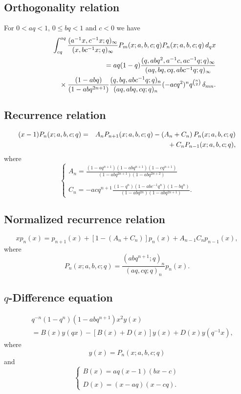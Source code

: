 \documentclass[envcountchap,graybox]{svmono}
\newcommand{\mathindent}{\hspace{7.5mm}}
\begin{document}
\subsection*{Orthogonality relation}
For $0<aq<1$, $0\leq bq<1$ and $c<0$ we have
\begin{eqnarray}
\label{OrtBigqJacobi}
& &\int_{cq}^{aq}\frac{(a^{-1}x,c^{-1}x;q)_{\infty}}{(x,bc^{-1}x;q)_{\infty}}
P_m(x;a,b,c;q)P_n(x;a,b,c;q)\,d_qx\nonumber\\
& &{}=aq(1-q)\frac{(q,abq^2,a^{-1}c,ac^{-1}q;q)_{\infty}}{(aq,bq,cq,abc^{-1}q;q)_{\infty}}\nonumber\\
& &{}\mathindent{}\times\frac{(1-abq)}{(1-abq^{2n+1})}
\frac{(q,bq,abc^{-1}q;q)_n}{(aq,abq,cq;q)_n}(-acq^2)^nq^{\binom{n}{2}}\,\delta_{mn}.
\end{eqnarray}

\subsection*{Recurrence relation}
\begin{eqnarray}
\label{RecBigqJacobi}
(x-1)P_n(x;a,b,c;q)&=&A_nP_{n+1}(x;a,b,c;q)-\left(A_n+C_n\right)P_n(x;a,b,c;q)\nonumber\\
& &{}\mathindent{}+C_nP_{n-1}(x;a,b,c;q),
\end{eqnarray}
where
$$\left\{\begin{array}{l}
\displaystyle A_n=\frac{(1-aq^{n+1})(1-abq^{n+1})(1-cq^{n+1})}{(1-abq^{2n+1})(1-abq^{2n+2})}\\
\\
\displaystyle C_n=-acq^{n+1}\frac{(1-q^n)(1-abc^{-1}q^n)(1-bq^n)}{(1-abq^{2n})(1-abq^{2n+1})}.
\end{array}\right.$$

\subsection*{Normalized recurrence relation}
\begin{equation}
\label{NormRecBigqJacobi}
xp_n(x)=p_{n+1}(x)+\left[1-(A_n+C_n)\right]p_n(x)+A_{n-1}C_np_{n-1}(x),
\end{equation}
where
$$P_n(x;a,b,c;q)=\frac{(abq^{n+1};q)_n}{(aq,cq;q)_n}p_n(x).$$

\subsection*{$q$-Difference equation}
\begin{eqnarray}
\label{dvBigqJacobi}
& &q^{-n}(1-q^n)(1-abq^{n+1})x^2y(x)\nonumber\\
& &{}=B(x)y(qx)-\left[B(x)+D(x)\right]y(x)+D(x)y(q^{-1}x),
\end{eqnarray}
where
$$y(x)=P_n(x;a,b,c;q)$$
and
$$\left\{\begin{array}{l}\displaystyle B(x)=aq(x-1)(bx-c)\\
\\
\displaystyle D(x)=(x-aq)(x-cq).\end{array}\right.$$
\end{document}
